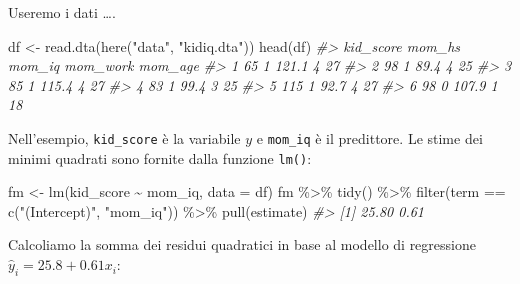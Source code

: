 \documentclass[
  10pt,
  italian,
  a4paper,
  extrafontsizes,onecolumn,openright
  ]{memoir}
\newenvironment{Shaded}{\begin{snugshade}}{\end{snugshade}}
\newcommand{\AttributeTok}[1]{\textcolor[rgb]{0.77,0.63,0.00}{#1}}
\newcommand{\CommentTok}[1]{\textcolor[rgb]{0.56,0.35,0.01}{\textit{#1}}}
\newcommand{\FloatTok}[1]{\textcolor[rgb]{0.00,0.00,0.81}{#1}}
\newcommand{\FunctionTok}[1]{\textcolor[rgb]{0.00,0.00,0.00}{#1}}
\newcommand{\NormalTok}[1]{#1}
\newcommand{\OtherTok}[1]{\textcolor[rgb]{0.56,0.35,0.01}{#1}}
\newcommand{\SpecialCharTok}[1]{\textcolor[rgb]{0.00,0.00,0.00}{#1}}
\newcommand{\StringTok}[1]{\textcolor[rgb]{0.31,0.60,0.02}{#1}}
\begin{document}
Useremo i dati \ldots.

\begin{Shaded}
\begin{Highlighting}[]
\NormalTok{df }\OtherTok{\textless{}{-}} \FunctionTok{read.dta}\NormalTok{(}\FunctionTok{here}\NormalTok{(}\StringTok{"data"}\NormalTok{, }\StringTok{"kidiq.dta"}\NormalTok{))}
\FunctionTok{head}\NormalTok{(df)}
\CommentTok{\#\textgreater{}   kid\_score mom\_hs mom\_iq mom\_work mom\_age}
\CommentTok{\#\textgreater{} 1        65      1  121.1        4      27}
\CommentTok{\#\textgreater{} 2        98      1   89.4        4      25}
\CommentTok{\#\textgreater{} 3        85      1  115.4        4      27}
\CommentTok{\#\textgreater{} 4        83      1   99.4        3      25}
\CommentTok{\#\textgreater{} 5       115      1   92.7        4      27}
\CommentTok{\#\textgreater{} 6        98      0  107.9        1      18}
\end{Highlighting}
\end{Shaded}

Nell'esempio, \texttt{kid\_score} è la variabile \(y\) e \texttt{mom\_iq} è il predittore. Le stime dei minimi quadrati sono fornite dalla funzione \texttt{lm()}:

\begin{Shaded}
\begin{Highlighting}[]
\NormalTok{fm }\OtherTok{\textless{}{-}} \FunctionTok{lm}\NormalTok{(kid\_score }\SpecialCharTok{\textasciitilde{}}\NormalTok{ mom\_iq, }\AttributeTok{data =}\NormalTok{ df)}
\NormalTok{fm }\SpecialCharTok{\%\textgreater{}\%}
  \FunctionTok{tidy}\NormalTok{() }\SpecialCharTok{\%\textgreater{}\%}
  \FunctionTok{filter}\NormalTok{(term }\SpecialCharTok{==} \FunctionTok{c}\NormalTok{(}\StringTok{"(Intercept)"}\NormalTok{, }\StringTok{"mom\_iq"}\NormalTok{)) }\SpecialCharTok{\%\textgreater{}\%}
  \FunctionTok{pull}\NormalTok{(estimate)}
\CommentTok{\#\textgreater{} [1] 25.80  0.61}
\end{Highlighting}
\end{Shaded}

Calcoliamo la somma dei residui quadratici in base al modello di regressione \(\hat{y}_i = 25.8 + 0.61 x_i\):

\begin{Shaded}
\end{Shaded}
\end{document}

